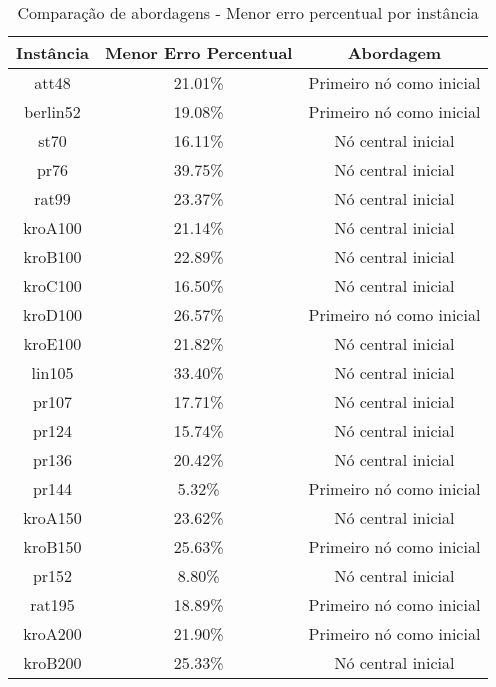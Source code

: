 \documentclass[10pt]{extarticle} %
\begin{document}
\begin{table}[H]
\centering
\begin{tabular}{|c|c|c|} \hline
\textbf{Instância} & \textbf{Menor Erro Percentual} & \textbf{Abordagem} \\ \hline
    att48       & 21.01\%   & Primeiro nó como inicial \\ \hline
    berlin52    & 19.08\%   & Primeiro nó como inicial \\ \hline
    st70        & 16.11\%   & Nó central inicial       \\ \hline
    pr76        & 39.75\%   & Nó central inicial       \\ \hline
    rat99       & 23.37\%   & Nó central inicial       \\ \hline
    kroA100     & 21.14\%   & Nó central inicial       \\ \hline
    kroB100     & 22.89\%   & Nó central inicial       \\ \hline
    kroC100     & 16.50\%   & Nó central inicial       \\ \hline
    kroD100     & 26.57\%   & Primeiro nó como inicial \\ \hline
    kroE100     & 21.82\%   & Nó central inicial       \\ \hline
    lin105      & 33.40\%   & Nó central inicial       \\ \hline
    pr107       & 17.71\%   & Nó central inicial       \\ \hline
    pr124       & 15.74\%   & Nó central inicial       \\ \hline
    pr136       & 20.42\%   & Nó central inicial       \\ \hline
    pr144       & 5.32\%    & Primeiro nó como inicial \\ \hline
    kroA150     & 23.62\%   & Nó central inicial       \\ \hline
    kroB150     & 25.63\%   & Primeiro nó como inicial \\ \hline
    pr152       & 8.80\%    & Nó central inicial       \\ \hline
    rat195      & 18.89\%   & Primeiro nó como inicial \\ \hline
    kroA200     & 21.90\%   & Primeiro nó como inicial \\ \hline
    kroB200     & 25.33\%   & Nó central inicial       \\ \hline
\end{tabular}
\caption{Comparação de abordagens - Menor erro percentual por instância}
\label{tab:comparison}
\end{table}
\end{document}
